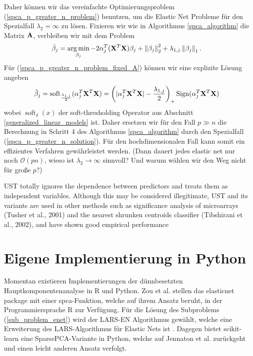 Daher können wir das vereinfachte Optimierungsproblem (\ref{spca_p_greater_n_problem}) benutzen, um die Elastic Net Probleme für den Spezialfall $\lambda_2 = \infty$ zu lösen. Fixieren wir wie in Algorithmus \ref{spca_algorithm} die Matrix $\mathbf{A}$, verbleiben wir mit dem Problem
\begin{align}
\label{spca_p_greater_n_problem_fixed_A}
\hat{\beta}_j = \operatorname*{arg\,min}_{\beta_j} -2 \alpha_j^T(\mathbf{X}^T\mathbf{X})\beta_j + \left\lVert \beta_j \right\rVert_{2}^{2} + \lambda_{1,j}\left\lVert \beta_j \right\rVert_1.
\end{align}
Für (\ref{spca_p_greater_n_problem_fixed_A}) können wir eine explizite Lösung angeben
\begin{align}
\label{spca_p_greater_n_solution}
\hat{\beta}_j = \operatorname{soft}_{\frac{\lambda_{1,j}}{2}}(\alpha_j^T\mathbf{X}^T\mathbf{X}) = \left(|\alpha_j^T\mathbf{X}^T\mathbf{X}| - \frac{\lambda_{1,j}}{2}\right)_+ \operatorname{Sign}(\alpha_j^T\mathbf{X}^T\mathbf{X})
\end{align}
wobei $\operatorname{soft}_{\delta}(x)$ der soft-thresholding Operator aus Abschnitt \ref{generalized_linear_models} ist. Daher ersetzen wir für den Fall $p \gg n$ die Berechnung in Schritt 4 des Algorithmus \ref{spca_algorithm} durch den Spezialfall (\ref{spca_p_greater_n_solution}). Für den hochdimensionalen Fall kann somit ein effizientes Verfahren gewährleistet werden. (Dann dauert jedes elastic net nur noch $\mathcal{O}(pn)$, wieso ist $\lambda_2 \to \infty$ sinnvoll? Und warum wählen wir den Weg nicht für große $p$?)

UST totally ignores the dependence between predictors and treats them as independent variables. Although this may be considered illegitimate, UST and its variants are used in other methods such as significance analysis of microarrays (Tusher et al., 2001) and the nearest shrunken
centroids classifier (Tibshirani et al., 2002), and have shown good empirical performance




\section{Eigene Implementierung in Python}

Momentan existieren Implementierungen der dünnbesetzten Hauptkomponentenanalyse in R und Python. Zou et al. stellen das elasticnet package mit einer spca-Funktion, welche auf ihrem Ansatz beruht, in der Programmiersprache R zur Verfügung. Für die Lösung des Subproblems (\ref{sub_problem_enet}) wird der LARS-EN Algorithmus gewählt, welche eine Erweiterung des LARS-Algorithmus für Elastic Nets ist \cite{zou_elasticnet}. Dagegen bietet scikit-learn eine SparsePCA-Variante in Python, welche auf Jennaton et al. \cite{jennaton} zurückgeht und einen leicht anderen Ansatz verfolgt.


